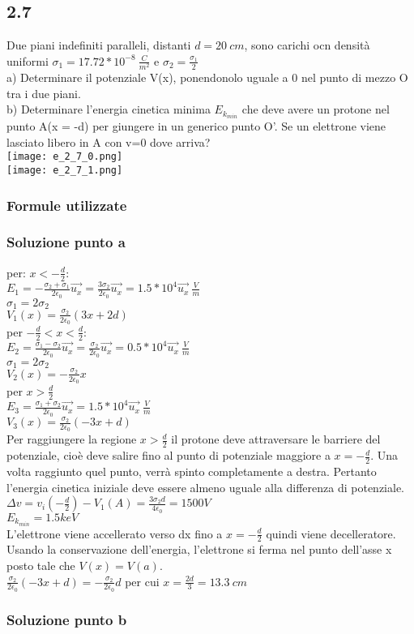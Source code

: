 \documentclass[../../main.tex]{subfiles}
\begin{document}
\subsection*{2.7}
Due piani indefiniti paralleli, distanti $d = 20\ cm$, sono carichi ocn densità uniformi $\sigma_1=17.72 * 10^{-8}\ \frac{C}{m^2}$ e $\sigma_2 = \frac{\sigma_1}{2}$
\\a) Determinare il potenziale V(x), ponendonolo uguale a 0 nel punto di mezzo O tra i due piani.
\\b) Determinare l'energia cinetica minima $E_{k_{min}}$ che deve avere un protone nel punto A(x = -d) per giungere in un generico punto O'. Se un elettrone viene lasciato libero in A con v=0 dove arriva?
\\\texttt{[image: e\_2\_7\_0.png]}
\\\texttt{[image: e\_2\_7\_1.png]}
\subsubsection*{Formule utilizzate}
\subsubsection*{Soluzione punto a}
per: $x < -\frac{d}{2}$:
\\$E_1 = -\frac{\sigma_2 + \sigma_1}{2\epsilon_0}\vec{u_x} = \frac{3\sigma_2}{2\epsilon_0}\vec{u_x} = 1.5 * 10^4\vec{u_x}\ \frac{V}{m}$
\\$\sigma_1 = 2\sigma_2$
\\$V_1(x) = \frac{\sigma_2}{2\epsilon_0}(3x + 2d)$
\\per $-\frac{d}{2} < x < \frac{d}{2}$:
\\$E_2 = \frac{\sigma_1 - \sigma_2}{2\epsilon_0}\vec{u_x} = \frac{\sigma_2}{2\epsilon_0}\vec{u_x} = 0.5*10^4\vec{u_x}\ \frac{V}{m}$
\\$\sigma_1 = 2\sigma_2$
\\$V_2(x) = -\frac{\sigma_2}{2\epsilon_0}x$
\\per $x > \frac{d}{2}$
\\$E_3 = \frac{\sigma_1 + \sigma_2}{2\epsilon_0}\vec{u_x} = 1.5 * 10^4 \vec{u_x}\ \frac{V}{m}$
\\$V_3(x) = \frac{\sigma_2}{2\epsilon_0}(-3x+d)$
\\Per raggiungere la regione $x > \frac{d}{2}$ il protone deve attraversare le barriere del potenziale, cioè deve salire fino al punto di potenziale maggiore a $x = -\frac{d}{2}$. Una volta raggiunto quel punto, verrà spinto completamente a destra. Pertanto l'energia cinetica iniziale deve essere almeno uguale alla differenza di potenziale.
\\$\Delta v=v_i(-\frac{d}{2})-V_1(A) = \frac{3\sigma_2 d}{4\epsilon_0} = 1500V $
\\$E_{k_{min}} = 1.5 keV$
\\L'elettrone viene accellerato verso dx fino a $x = -\frac{d}{2}$ quindi viene decelleratore.
\\Usando la conservazione dell'energia, l'elettrone si ferma nel punto dell'asse x posto tale che $V(x) = V(a)$.
\\$\frac{\sigma_2}{2\epsilon_0}(-3x+d) = - \frac{\sigma_2}{2\epsilon_0}d$ per cui $x = \frac{2d}{3} = 13.3\ cm$


\subsubsection*{Soluzione punto b}
\newpage
\end{document}
